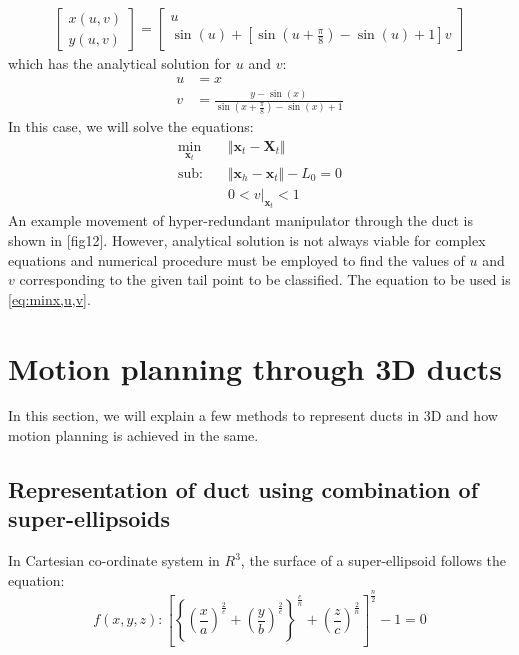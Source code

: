 \documentclass[12pt,a4]{article}
\begin{document}
\begin{align}
\begin{bmatrix}
x(u,v)\\y(u,v)
\end{bmatrix} = 
\begin{bmatrix}
u\\\sin\left(u\right)+\left[\sin\left(u+\frac{\pi}{8}\right)-\sin\left(u\right)+1 \right]v
\end{bmatrix}
\end{align}
which has the analytical solution for $u$ and $v$:
\begin{align*}
u &= x\\
v &= \frac{y-\sin\left(x\right)}{\sin\left(x+\frac{\pi}{8}\right)-\sin\left(x\right)+1}
\end{align*}
In this case, we will solve the equations:
\begin{align}
\label{eq:analy2D}
\min_{\textbf{x}_t} &\Vert \textbf{x}_t-\textbf{X}_t \Vert\\
\nonumber \text{sub:~~~} &\Vert \textbf{x}_h - \textbf{x}_t \Vert -L_0 = 0\\
&0< v\vert_{\mathbf{x}_t}< 1
\end{align} 
 An example movement of hyper-redundant manipulator through the duct is shown in [fig12]. However, analytical solution is not always viable for complex equations and numerical procedure must be employed to find the values of $u$ and $v$ corresponding to the given tail point to be classified. The equation to be used is \ref{eq:minx,u,v}.




\section{Motion planning through 3D ducts}
In this section, we will explain a few methods to represent ducts in 3D and how motion planning is achieved in the same.
\subsection{Representation of duct using combination of super-ellipsoids}
In Cartesian co-ordinate system in $R^3$, the surface of a super-ellipsoid follows the equation:
\begin{equation}
f(x,y,z) : \left[ \left\lbrace \left(\frac{x}{a} \right)^{\frac 2e} +\left(\frac{y}{b} \right)^{\frac 2e} \right\rbrace^{\frac{e}{n}} +\left(\frac{z}{c} \right)^{\frac 2n}  \right]^\frac n2-1 =0
\end{equation}
\end{document}
